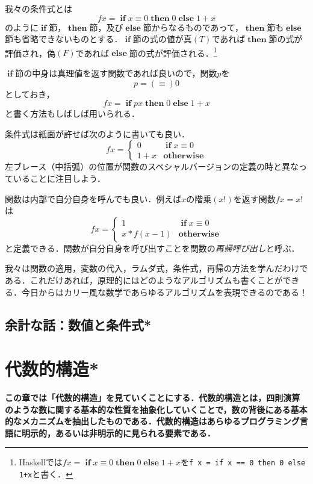 \documentclass[twocolumn]{jsbook}
\newcommand{\keyword}[1]{{\emph{#1}}}
\newcommand{\code}[1]{\texttt{#1}}
\newenvironment{leader}{\begingroup\bf}{\endgroup}
\newcommand{\mathKeyword}[1]{\mathbf{#1}}
\DeclareMathOperator{\mathIf}{\mathKeyword{if}}
\DeclareMathOperator{\mathElse}{\mathKeyword{else}}
\DeclareMathOperator{\mathThen}{\mathKeyword{then}}
\newcommand{\mathOtherwise}{\mathKeyword{otherwise}}
\begin{document}
我々の条件式とは$$fx=\mathIf x\equiv0\mathThen0\mathElse1+x$$のように$\mathIf$節，$\mathThen$節，及び$\mathElse$節からなるものであって，$\mathThen$節も$\mathElse$節も省略できないものとする．$\mathIf$節の式の値が真$(T)$であれば$\mathThen$節の式が評価され，偽$(F)$であれば$\mathElse$節の式が評価される．\footnote{Haskellでは$fx=\mathIf x\equiv0\mathThen0\mathElse1+x$を\code{f x = if x == 0 then 0 else 1+x}と書く．}

$\mathIf$節の中身は真理値を返す関数であれば良いので，関数$p$を$$p=(\equiv)0$$としておき，$$fx=\mathIf px\mathThen0\mathElse1+x$$と書く方法もしばしば用いられる．

条件式は紙面が許せば次のように書いても良い．
\begin{equation*}
fx=\begin{cases}
0&\mathIf x\equiv0\\
1+x&\mathOtherwise
\end{cases}
\end{equation*}
左ブレース（中括弧）の位置が関数のスペシャルバージョンの定義の時と異なっていることに注目しよう．

関数は内部で自分自身を呼んでも良い．例えば$x$の階乗$(x!)$を返す関数$fx=x!$は
\begin{equation*}
fx=\begin{cases}
1&\mathIf x\equiv0\\
x*f(x-1)&\mathOtherwise
\end{cases}
\end{equation*}
と定義できる．関数が自分自身を呼び出すことを関数の\keyword{再帰呼び出し}と呼ぶ．

我々は関数の適用，変数の代入，ラムダ式，条件式，再帰の方法を学んだわけである．これだけあれば，原理的にはどのようなアルゴリズムも書くことができる．今日からはカリー風な数学であらゆるアルゴリズムを表現できるのである！

\section{余計な話：数値と条件式*}


\chapter{代数的構造*}

\begin{leader}
この章では「代数的構造」を見ていくことにする．代数的構造とは，四則演算のような数に関する基本的な性質を抽象化していくことで，数の背後にある基本的なメカニズムを抽出したものである．代数的構造はあらゆるプログラミング言語に明示的，あるいは非明示的に見られる要素である．
\end{leader}
\end{document}
